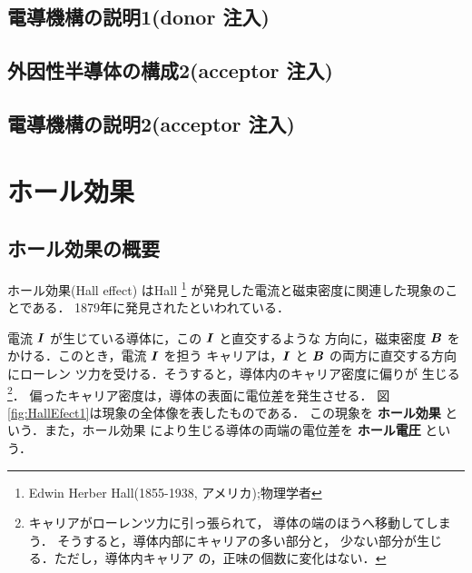         \subsection{電導機構の説明1(donor 注入)}

        \subsection{外因性半導体の構成2(acceptor 注入)}

        \subsection{電導機構の説明2(acceptor 注入)}

    \section{ホール効果}
        \subsection{ホール効果の概要}
            ホール効果(Hall effect) はHall
                \footnote{
                    Edwin Herber Hall(1855-1938, アメリカ);物理学者
                }
            が発見した電流と磁束密度に関連した現象のことである．
            1879年に発見されたといわれている．

            電流 $\boldsymbol{I}$ が生じている導体に，この $\boldsymbol{I}$ と直交するような
            方向に，磁束密度 $\boldsymbol{B}$ をかける．このとき，電流 $\boldsymbol{I}$ を担う
            キャリアは，$\boldsymbol{I}$ と $\boldsymbol{B}$ の両方に直交する方向にローレン
            ツ力を受ける．そうすると，導体内のキャリア密度に偏りが
            生じる
                \footnote{
                    キャリアがローレンツ力に引っ張られて，
                    導体の端のほうへ移動してしまう．
                    そうすると，導体内部にキャリアの多い部分と，
                    少ない部分が生じる．ただし，導体内キャリア
                    の，正味の個数に変化はない．
                }．
            偏ったキャリア密度は，導体の表面に電位差を発生させる．
            図\ref{fig:HallEfect1}は現象の全体像を表したものである．
            この現象を \textbf{ホール効果} という．また，ホール効果
            により生じる導体の両端の電位差を \textbf{ホール電圧} という．

